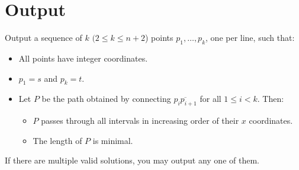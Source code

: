 \section*{Output}
Output a sequence of $k$ $(2 \le k \le n+2$) points $p_1, \dots, p_k$, one per line, such that:
\begin{itemize}
	\item All points have integer coordinates.
	\item $p_1 = s$ and $p_k = t$.
	\item Let $P$ be the path obtained by connecting $\overline{p_i p_{i+1}}$ for all $1 \le i < k$. Then:
	\begin{itemize}
		\item $P$ passes through all intervals in increasing order of their $x$ coordinates.
		\item The length of $P$ is minimal.
	\end{itemize}
\end{itemize}
If there are multiple valid solutions, you may output any one of them.
